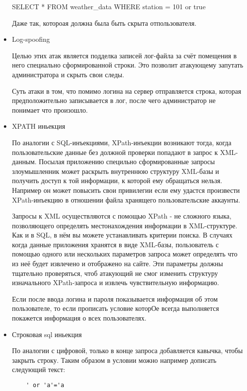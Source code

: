 \documentclass{article}
\begin{document}
\begin{itemize}
	SELECT * FROM weather\_data WHERE station = 101 or true
	
	Даже так, котороая должна была быть скрыта отпользователя.
	
	\item Log-spoofing
	
	Целью этих атак является подделка записей лог-файла за счёт помещения в него специально сформированной строки.
	Это позволит атакующему запутать администратора и скрыть свои следы.
	
	Суть атаки в том, что помимо логина на сервер отправляется строка, которая предположительно записывается в лог, после чего администратор не понимает что произошло.
	
	\item XPATH иньекция
	
	По аналогии с SQL-инъекциями, XPath-инъекции возникают тогда, когда пользовательские
	данные без должной проверки попадают в запрос к XML-данным. Посылая приложению
	специльно сформированные запросы злоумышленник может раскрыть внутреннюю структуру
	XML-базы и получить доступ к той информации, к которой ему обращаться нельзя.
	Например он может повысить свои привилегии если ему удастся
	произвести XPath-инъекцию в отношении файла хранящего пользовательские аккаунты.
	
	Запросы к XML осуществляются с помощью XPath - не сложного языка, позволяющего
	определять местонахождения информации в XML-структуре. Как и в SQL, в нём вы можете
	устанавливать критерии поиска. В случаях когда данные приложения хранятся в виде XML-базы,
	пользователь с помощью одного или нескольких параметров запроса может определять что из неё будет
	извлечено и отображено на сайте. Эти параметры должны тщательно проверяться, чтоб атакующий
	не смог изменить структуру изначального XPath-запроса и извлечь чувствительную информацию.
	
	Если после ввода логина и пароля показывается информация об этом пользователе, то если прописать условие которОе всегда выполняется покажется информация о всех пользователях.
	
	\item Строковая sql иньекция
	
	По аналогии с цифровой, только в конце запроса добавляется кавычка, чтобы закрыть строку. Таким образом в условии можно например дописать следующий текст:
	
	\begin{verbatim}
	' or 'a'='a
	\end{verbatim}
	
\end{itemize}
\end{document}
